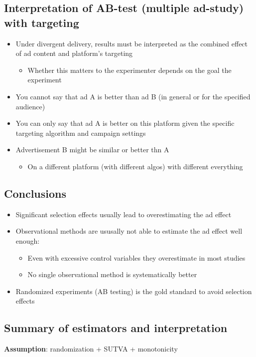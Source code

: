 \documentclass[10pt]{article}
\begin{document}
\subsection{Interpretation of AB-test (multiple ad-study) with targeting}
\begin{itemize}
    \item Under divergent delivery, results must be interpreted as the combined effect of ad content and platform's targeting 
    \begin{itemize}
        \item Whether this matters to the experimenter depends on the goal the experiment
    \end{itemize}
    \item You cannot say that ad A is better than ad B (in general or for the specified audience)
    \item You can only say that ad A is better on this platform given the specific targeting algorithm and campaign settings 
    \item Advertisement B might be similar or better thn A 
    \begin{itemize}
        \item On a different platform (with different algos) with different everything
    \end{itemize}
\end{itemize}
\subsection{Conclusions}
\begin{itemize}
    \item Significant selection effects usually lead to overestimating the ad effect 
    \item Observational methods are ususally not able to estimate the ad effect well enough: 
    \begin{itemize}
        \item Even with excessive control variables they overestimate in most studies 
        \item No single observational method is systematically better 
    \end{itemize}
    \item Randomized experiments (AB testing) is the gold standard to avoid selection effects 
\end{itemize}
\newpage 
\subsection{Summary of estimators and interpretation}
\textbf{Assumption}: randomization + SUTVA + monotonicity
\end{document}
